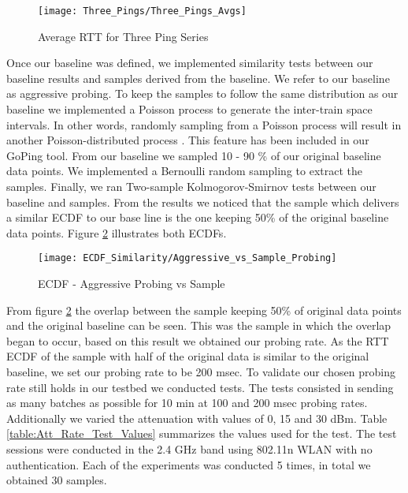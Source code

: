 \begin{figure}[h]
	\centering
	\texttt{[image: Three\_Pings/Three\_Pings\_Avgs]}
	\caption{Average RTT for Three Ping Series}
	\label{image:Avg_RTT_Three_Pings}
\end{figure}

Once our baseline was defined, we implemented similarity tests between our baseline results and samples derived from the baseline. We refer to our baseline as aggressive probing. To keep the samples to follow the same distribution as our baseline we implemented a Poisson process to generate the inter-train space intervals. In other words, randomly sampling from a Poisson process will result in another Poisson-distributed process \cite{raikov_decomposition}. This feature has been included in our GoPing tool. From our baseline we sampled 10 - 90 \% of our original baseline data points. We implemented a Bernoulli random sampling to extract the samples. Finally, we ran Two-sample Kolmogorov-Smirnov tests between our baseline and samples. From the results we noticed that the sample which delivers a similar ECDF to our base line is the one keeping 50\% of the original baseline data points. Figure \ref{image:ECDF_aggressive_vs_sampling} illustrates both ECDFs.

\begin{figure}[h]
	\centering
	\texttt{[image: ECDF\_Similarity/Aggressive\_vs\_Sample\_Probing]}
	\caption{ECDF - Aggressive Probing vs Sample}
	\label{image:ECDF_aggressive_vs_sampling}
\end{figure}

From figure \ref{image:ECDF_aggressive_vs_sampling} the overlap between the sample keeping 50\% of original data points and the original baseline can be seen. This was the sample in which the overlap began to occur, based on this result we obtained our probing rate. As the RTT ECDF of the sample with half of the original data is similar to the original baseline, we set our probing rate to be 200 msec. To validate our chosen probing rate still holds in our testbed we conducted tests. The tests consisted in sending as many batches as possible for 10 min at 100 and 200 msec probing rates. Additionally we varied the attenuation with values of 0, 15 and 30 dBm. Table \ref{table:Att_Rate_Test_Values} summarizes the values used for the test. The test sessions were conducted in the 2.4 GHz band using 802.11n WLAN with no authentication. Each of the experiments was conducted 5 times, in total we obtained 30 samples.

